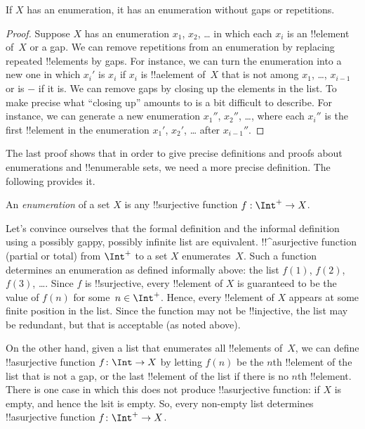 \documentclass[../../../include/open-logic-section]{subfiles}
\begin{document}
\begin{prop}
  If $X$ has an enumeration, it has an enumeration without gaps or
  repetitions.
\end{prop}

\begin{proof}
  Suppose $X$ has an enumeration $x_1$, $x_2$, \dots{} in which each
  $x_i$ is an !!{element} of~$X$ or a gap.  We can remove repetitions
  from an enumeration by replacing repeated !!{element}s by gaps. For
  instance, we can turn the enumeration into a new one in which $x_i'$
  is $x_i$ if $x_i$ is !!a{element} of~$X$ that is not among $x_1$,
  \dots, $x_{i-1}$ or is $-$ if it is. We can remove gaps by closing up
  the elements in the list. To make precise what ``closing up''
  amounts to is a bit difficult to describe. For instance, we can
  generate a new enumeration $x_1''$, $x_2''$, \dots, where each
  $x_i''$ is the first !!{element} in the enumeration $x_1'$, $x_2'$,
  \dots{} after $x_{i-1}''$.
\end{proof}

The last proof shows that in order to give precise definitions and
proofs about enumerations and !!{enumerable} sets, we need a more
precise definition.  The following provides it.

\begin{defn}[Enumeration]
An \emph{enumeration} of a set $X$ is any !!{surjective} function $f:
\Int^+ \to X$.
\end{defn}

\begin{explain}
Let's convince ourselves that the formal definition and the informal
definition using a possibly gappy, possibly infinite list are
equivalent. !!^a{surjective} function (partial or total) from $\Int^+$
to a set $X$ enumerates~$X$. Such a function determines an enumeration
as defined informally above: the list $f(1)$, $f(2)$, $f(3)$,
\dots. Since $f$ is !!{surjective}, every !!{element} of $X$ is
guaranteed to be the value of $f(n)$ for some~$n \in \Int^+$. Hence,
every !!{element} of $X$ appears at some finite position in the
list. Since the function may not be !!{injective}, the list may be
redundant, but that is acceptable (as noted above).

On the other hand, given a list that enumerates all !!{element}s
of~$X$, we can define !!a{surjective} function $f\colon \Int \to X$ by
letting $f(n)$ be the $n$th !!{element} of the list that is not a gap,
or the last !!{element} of the list if there is no $n$th !!{element}.
There is one case in which this does not produce !!a{surjective}
function: if $X$ is empty, and hence the lsit is empty. So, every
non-empty list determines !!a{surjective} function $f\colon \Int^+ \to
X$.
\end{explain}
\end{document}

